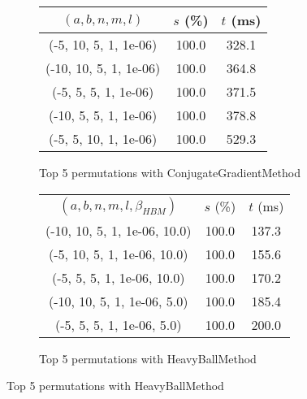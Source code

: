 \begin{figure}[H]
\begin{subfigure}[ht]{.5\textwidth}
\begin{tabular}{|c|c|c|}
\hline
\rowcolor{gray!25}
$(a,b,n,m,l)$ & $s$ (\%) & $t$ (ms) \\
\hline
(-5, 10, 5, 1, 1e-06) & 100.0 & 328.1 \\
(-10, 10, 5, 1, 1e-06) & 100.0 & 364.8 \\
(-5, 5, 5, 1, 1e-06) & 100.0 & 371.5 \\
(-10, 5, 5, 1, 1e-06) & 100.0 & 378.8 \\
(-5, 5, 10, 1, 1e-06) & 100.0 & 529.3 \\
\hline
\end{tabular}
\caption{Top 5 permutations with ConjugateGradientMethod}
\label{subfig:param_comp_MatrixSquareSum_ConjugateGradientMethod_UniformSearch}
\end{subfigure}
\hfill
\begin{subfigure}[ht]{.5\textwidth}
\begin{tabular}{|c|c|c|}
\hline
\rowcolor{gray!25}
\multicolumn{3}{|c|}{HeavyBallMethod} \\
\hline
\rowcolor{gray!25}
$(a,b,n,m,l,\beta_{HBM})$ & $s$ (\%) & $t$ (ms) \\
\hline
(-10, 10, 5, 1, 1e-06, 10.0) & 100.0 & 137.3 \\
(-5, 10, 5, 1, 1e-06, 10.0) & 100.0 & 155.6 \\
(-5, 5, 5, 1, 1e-06, 10.0) & 100.0 & 170.2 \\
(-10, 10, 5, 1, 1e-06, 5.0) & 100.0 & 185.4 \\
(-5, 5, 5, 1, 1e-06, 5.0) & 100.0 & 200.0 \\
\hline
\end{tabular}
\caption{Top 5 permutations with HeavyBallMethod}
\label{subfig:param_comp_MatrixSquareSum_HeavyBallMethod_UniformSearch}
\end{subfigure}
\end{figure}

